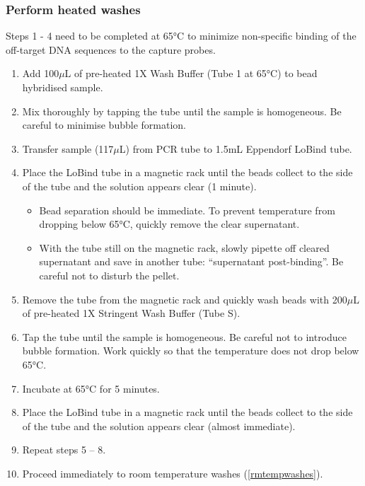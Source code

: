 \subsubsection{Perform heated washes} 
\label{heatedwashes}
Steps 1 - 4 need to be completed at 65°C to minimize non-specific binding of the off-target DNA sequences to the capture probes. 
\begin{enumerate}
	\item Add 100$\mu$L of pre-heated 1X Wash Buffer (Tube 1 at 65°C) to bead hybridised sample. 
	\item Mix thoroughly by tapping the tube until the sample is homogeneous. Be careful to minimise bubble formation. 
	\item Transfer sample (117$\mu$L) from PCR tube to 1.5mL Eppendorf LoBind tube.
	\item Place the LoBind tube in a magnetic rack until the beads collect to the side of the tube and the solution appears clear (1 minute).
	\begin{itemize}
		\item Bead separation should be immediate. To prevent temperature from dropping below 65°C, quickly remove the clear supernatant.
		\item With the tube still on the magnetic rack, slowly pipette off cleared supernatant and save in another tube: “supernatant post-binding”. Be careful not to disturb the pellet.
	\end{itemize} 
	\item Remove the tube from the magnetic rack and quickly wash beads with 200$\mu$L of pre-heated 1X Stringent Wash Buffer (Tube S).
	\item Tap the tube until the sample is homogeneous. Be careful not to introduce bubble formation. Work quickly so that the temperature does not drop below 65°C.
	\item Incubate at 65°C for 5 minutes.
	\item Place the LoBind tube in a magnetic rack until the beads collect to the side of the tube and the solution appears clear (almost immediate). 
	\item Repeat steps 5 – 8.
	\item Proceed immediately to room temperature washes (\cref{rmtempwashes}).
\end{enumerate} 

